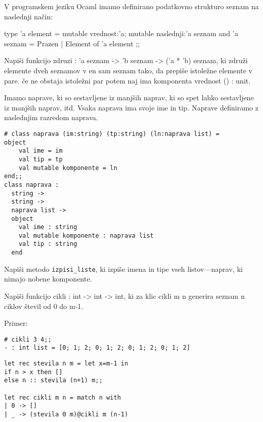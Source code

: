 \begin{ex}
  V programskem jeziku Ocaml imamo definirano podatkovno strukturo
  seznam na naslednji na\v cin:

  type 'a element = { 
     mutable vrednost:'a; 
     mutable naslednji:'a seznam 
  } 
  and 'a seznam = Prazen | Element of 'a element ;; 

  Napi\v si funkcijo zdruzi : 'a seznam -> 'b seznam -> ('a * 'b)
  seznam, ki zdru\v zi elemente dveh seznamov v en sam seznam tako, da
  prepi\v se istole\v zne elemente v pare. \v ce ne obstaja istole\v
  zni par potem naj ima komponenta vrednost () : unit.

 
\end{ex} 
\begin{ex}
  Imamo naprave, ki so sestavljene iz manj\v sih naprav, ki so spet
  lahko sestavljene iz manj\v sih naprav, itd. Vsaka naprava ima svoje
  ime in tip. Naprave definiramo z naslednjim razredom naprava.

\begin{verbatim}
# class naprava (im:string) (tp:string) (ln:naprava list) = 
object 
    val ime = im 
    val tip = tp 
    val mutable komponente = ln 
end;; 
class naprava : 
  string -> 
  string -> 
  naprava list -> 
  object 
    val ime : string 
    val mutable komponente : naprava list 
    val tip : string 
  end 
\end{verbatim}

  Napi\v si metodo \texttt{izpisi\_liste}, ki izpi\v se imena in tipe
  vseh listov—naprav, ki nimajo nobene komponente.



\end{ex} 
\begin{ex}
  Napi\v si funkcijo cikli : int -> int -> int, ki za klic cikli m n
  generira seznam n ciklov \v stevil od 0 do m-1.

\noindent\/Primer:
\begin{verbatim}
# cikli 3 4;; 
- : int list = [0; 1; 2; 0; 1; 2; 0; 1; 2; 0; 1; 2]
\end{verbatim}

\begin{sol}
\begin{verbatim}
let rec stevila n m = let x=m-1 in
if n > x then []
else n :: stevila (n+1) m;;

let rec cikli m n = match n with
| 0 -> []
| _ -> (stevila 0 m)@cikli m (n-1)
\end{verbatim}
\end{sol}

\end{ex} 
